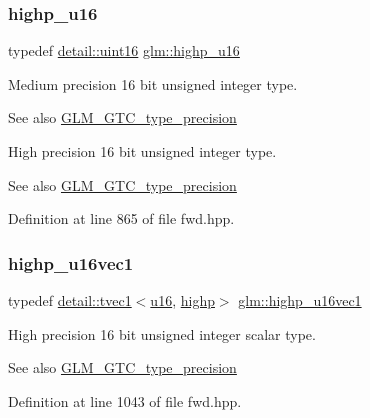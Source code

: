 \subsubsection{\texorpdfstring{highp\+\_\+u16}{highp\_u16}}
{\footnotesize\ttfamily typedef \hyperlink{namespaceglm_1_1detail_a47b2a7d006d187338e8031a352d1ce56}{detail\+::uint16} \hyperlink{group__gtc__type__precision_ga9da2178d7501d9c0f225fa1a7b70cb45}{glm\+::highp\+\_\+u16}}

Medium precision 16 bit unsigned integer type. \begin{DoxySeeAlso}{See also}
\hyperlink{group__gtc__type__precision}{G\+L\+M\+\_\+\+G\+T\+C\+\_\+type\+\_\+precision}
\end{DoxySeeAlso}
High precision 16 bit unsigned integer type. \begin{DoxySeeAlso}{See also}
\hyperlink{group__gtc__type__precision}{G\+L\+M\+\_\+\+G\+T\+C\+\_\+type\+\_\+precision} 
\end{DoxySeeAlso}


Definition at line 865 of file fwd.\+hpp.

\mbox{\label{group__gtc__type__precision_gac4a83dec879b77ab0055c8da232da066}} 
\subsubsection{\texorpdfstring{highp\+\_\+u16vec1}{highp\_u16vec1}}
{\footnotesize\ttfamily typedef \hyperlink{structglm_1_1detail_1_1tvec1}{detail\+::tvec1}$<$\hyperlink{group__gtc__type__precision_gae7a1571503f83d2264ddfa705a6b082a}{u16}, \hyperlink{namespaceglm_a0f04f086094c747d227af4425893f545ac6f7eab42eacbb10d59a58e95e362074}{highp}$>$ \hyperlink{group__gtc__type__precision_gac4a83dec879b77ab0055c8da232da066}{glm\+::highp\+\_\+u16vec1}}

High precision 16 bit unsigned integer scalar type. \begin{DoxySeeAlso}{See also}
\hyperlink{group__gtc__type__precision}{G\+L\+M\+\_\+\+G\+T\+C\+\_\+type\+\_\+precision} 
\end{DoxySeeAlso}


Definition at line 1043 of file fwd.\+hpp.

